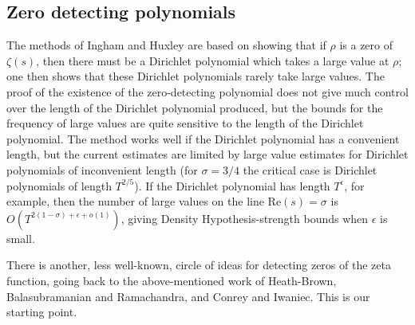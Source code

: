 \documentclass[12pt]{amsart}
\theoremstyle{plain}
\theoremstyle{definition}
\theoremstyle{remark}
\begin{document}
\subsection{Zero detecting polynomials}
%
%
%
%
The methods of Ingham and Huxley are based on showing that if $\rho$ is a zero of $\zeta(s)$, then there must be a Dirichlet polynomial which takes a large value at $\rho$; one then shows that these Dirichlet polynomials rarely take large values. The proof of the existence of the zero-detecting polynomial does not give much control over the length of the Dirichlet polynomial produced, but the bounds for the frequency of large values are quite sensitive to the length of the Dirichlet polynomial. The method works well if the Dirichlet polynomial has a convenient length, but the current estimates are limited by large value estimates for Dirichlet polynomials of inconvenient length (for $\sigma=3/4$ the critical case is Dirichlet polynomials of length $T^{2/5}$). If the Dirichlet polynomial has length $T^\epsilon$, for example, then the number of large values on the line $\text{Re}(s)=\sigma$ is $O(T^{2(1-\sigma)+\epsilon+o(1)})$, giving Density Hypothesis-strength bounds when $\epsilon$ is small.

There is another, less well-known, circle of ideas for detecting zeros of the zeta function, going back to the above-mentioned work of Heath-Brown, Balasubramanian and Ramachandra, and Conrey and Iwaniec. This is our starting point.
\end{document}
